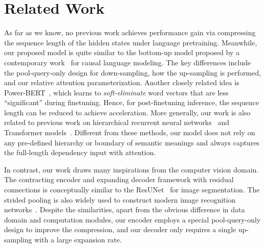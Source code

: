 \documentclass{article}
\theoremstyle{custom}
\begin{document}
 \section{Related Work}
\label{sec:related}
As far as we know, no previous work achieves performance gain via compressing the sequence length of the hidden states under language pretraining.
Meanwhile, our proposed model is quite similar to the bottom-up model proposed by a contemporary work~\citep{subramanian2020multi} for causal language modeling.
The key differences include the pool-query-only design for down-sampling, how the up-sampling is performed, and our relative attention parameterization.
Another closely related idea is Power-BERT~\cite{goyal2020power}, which learns to \textit{soft-eliminate} word vectors that are less ``significant'' during finetuning.
Hence, for post-finetuning inference, the sequence length can be reduced to achieve acceleration.
More generally, our work is also related to previous work on hierarchical recurrent neural networks~\cite{lin2015hierarchical} and Transformer models~\cite{zhang2019hibert,garg2019multiresolution}. 
Different from these methods, our model does not rely on any pre-defined hierarchy or boundary of semantic meanings and always captures the full-length dependency input with attention.

In contrast, our work draws many inspirations from the computer vision domain.
The contracting encoder and expanding decoder framework with residual connections is conceptually similar to the ResUNet~\cite{ronneberger2015u} for image segmentation.
The strided pooling is also widely used to construct modern image recognition networks~\cite{scherer2010evaluation}.
Despite the similarities, apart from the obvious difference in data domain and computation modules, our encoder employs a special pool-query-only design to improve the compression, and our decoder only requires a single up-sampling with a large expansion rate.
\end{document}
